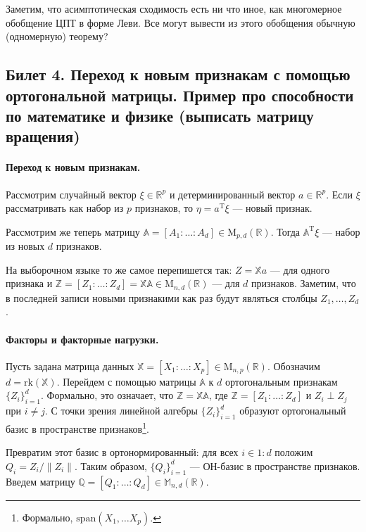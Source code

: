 Заметим, что асимптотическая сходимость есть ни что иное, как многомерное обобщение ЦПТ в форме Леви. Все могут вывести из этого обобщения обычную (одномерную) теорему?

\subsection{Билет 4. Переход к новым признакам с помощью ортогональной матрицы. Пример про способности по математике и физике (выписать матрицу вращения)}

\paragraph{Переход к новым признакам.}
Рассмотрим случайный вектор $\xi \in \mathbb R^p$ и детерминированный вектор $a \in \mathbb R^p$.
Если $\xi$ рассматривать как набор из $p$ признаков, то $\eta = a^\mathrm T \xi$ --- новый признак.

Рассмотрим же теперь матрицу $\mathbb A = [A_1 \colon \ldots \colon A_d] \in \mathrm M_{p, d}(\mathbb R)$. Тогда $\mathbb A^\mathrm T \xi$ --- набор из новых $d$ признаков.

На выборочном языке то же самое перепишется так:
$Z = \mathbb X a$ --- для одного признака и $\mathbb Z = [Z_1 \colon \ldots \colon Z_d] = \mathbb {X A} \in \mathrm M_{n, d}(\mathbb R)$ --- для $d$ признаков.
Заметим, что в последней записи новыми признакими как раз будут являться столбцы $Z_1, \ldots, Z_d$.

\paragraph{Факторы и факторные нагрузки.}
Пусть задана матрица данных $\mathbb X = [X_1 \colon \ldots \colon X_p] \in \mathrm M_{n, p}(\mathbb R)$. Обозначим $d = \mathrm{rk} (\mathbb X)$.
Перейдем с помощью матрицы $\mathbb A$ к $d$ ортогональным признакам $\{Z_i\}_{i=1}^d$.
Формально, это означает, что $\mathbb Z = \mathbb {X A}$, где $\mathbb Z = [Z_1 \colon \ldots \colon Z_d]$ и $Z_i \perp Z_j$ при $i \neq j$.
С точки зрения линейной алгебры $\{Z_i\}_{i=1}^d$ образуют ортогональный базис в пространстве признаков\footnote{Формально, $\mathrm {span} (X_1, \ldots X_p)$.}.

Превратим этот базис в ортонормированный: для всех $i \in 1:d$ положим $Q_i = Z_i / \|Z_i\|$.
Таким образом, $\{Q_i\}_{i=1}^d$ --- ОН-базис в пространстве признаков.
Введем матрицу $\mathbb Q = [Q_1 \colon \ldots \colon Q_d] \in \mathbb M_{n,d}(\mathbb R)$.

